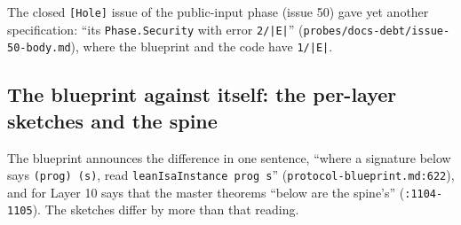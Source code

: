 \begin{sloppypar}
The closed \texttt{[Hole]} issue of the public-input phase (issue 50) gave yet another specification: ``its \texttt{Phase.\allowbreak{}Security} with error \texttt{2/\allowbreak{}|E|}'' (\texttt{probes/\allowbreak{}docs-\allowbreak{}debt/\allowbreak{}issue-\allowbreak{}50-\allowbreak{}body.\allowbreak{}md}), where the blueprint and the code have \texttt{1/\allowbreak{}|E|}.
\end{sloppypar}

\subsection{The blueprint against itself: the per-layer sketches and the spine}\label{sec:docs-sketches}

\begin{sloppypar}
The blueprint announces the difference in one sentence, ``where a signature below says \texttt{(\allowbreak{}prog) (\allowbreak{}s)}, read \texttt{lean\allowbreak{}Isa\allowbreak{}Instance prog s}'' (\texttt{protocol-\allowbreak{}blueprint.\allowbreak{}md:\allowbreak{}622}), and for Layer 10 says that the master theorems ``below are the spine's'' (\texttt{:\allowbreak{}1104-\allowbreak{}1105}). The sketches differ by more than that reading.
\end{sloppypar}

